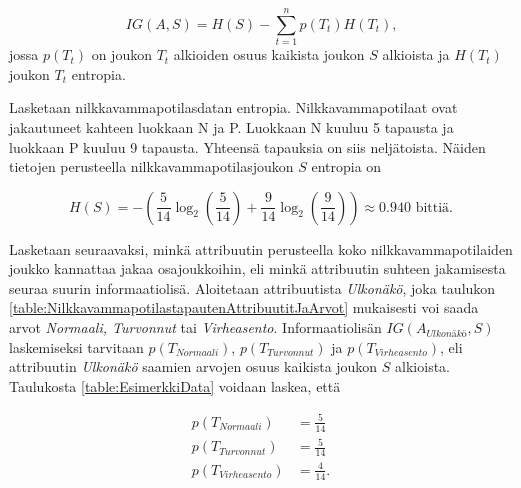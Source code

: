\documentclass[12pt,finnish]{tktltiki2}
\theoremstyle{definition}
\theoremstyle{remark}
\begin{document}
\[ IG(A,S) = H(S) -\sum_{t = 1}^{n} p(T_t)H(T_t) \mbox{,}\]
jossa $p(T_t)$ on joukon $T_t$ alkioiden osuus kaikista joukon $S$ alkioista ja $H(T_t)$ joukon $T_t$
entropia. 

Lasketaan nilkkavammapotilasdatan entropia. Nilkkavammapotilaat ovat jakautuneet kahteen luokkaan N ja P.
Luokkaan N kuuluu 5 tapausta ja luokkaan P kuuluu 9 tapausta. Yhteensä tapauksia on siis neljätoista. Näiden
tietojen perusteella nilkkavammapotilasjoukon $S$ entropia on

\[ H(S) = -\left(\frac{5}{14}\log_2\left(\frac{5}{14}\right) + \frac{9}{14}\log_2\left(\frac{9}{14}\right)\right) \approx 0.940 \mbox{ bittiä.} \] 

Lasketaan seuraavaksi, minkä attribuutin perusteella koko nilkkavammapotilaiden joukko kannattaa jakaa osajoukkoihin,
eli minkä attribuutin suhteen jakamisesta seuraa suurin informaatiolisä. Aloitetaan attribuutista \textit{Ulkonäkö},
joka taulukon \ref{table:NilkkavammapotilastapautenAttribuutitJaArvot} mukaisesti
voi saada arvot \textit{Normaali, Turvonnut} tai \textit{Virheasento}. Informaatiolisän $IG(A_{Ulkonäkö},S)$ laskemiseksi
tarvitaan $p(T_{Normaali})$, $p(T_{Turvonnut})$ ja $p(T_{Virheasento})$, eli attribuutin \textit{Ulkonäkö} saamien arvojen
osuus kaikista joukon $S$ alkioista. Taulukosta \ref{table:EsimerkkiData} voidaan laskea, että

\begin{equation*}
\begin{split}
p(T_{Normaali}) &= \frac{5}{14} \\
p(T_{Turvonnut}) &= \frac{5}{14} \\
p(T_{Virheasento}) &= \frac{4}{14} \mbox{.}
\end{split}
\end{equation*}

\end{document}
